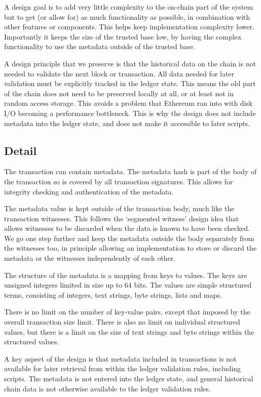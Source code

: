 \documentclass[11pt,a4paper,dvipsnames,twosided]{article}
\begin{document}
A design goal is to add very little complexity to the on-chain part of the
system but to get (or allow for) as much functionality as possible, in
combination with other features or components. This helps keep implementation
complexity lower. Importantly it keeps the size of the trusted base low, by
having the complex functionality to use the metadata outside of the trusted
base.

A design principle that we preserve is that the historical data on the chain is
not needed to validate the next block or transaction. All data needed for later
validation must be explicitly tracked in the ledger state. This means the old
part of the chain does not need to be preserved locally at all, or at least not
in random access storage. This avoids a problem that Ethereum ran into with
disk I/O becoming a performance bottleneck. This is why the design does not
include metadata into the ledger state, and does not make it accessible to
later scripts.

\subsection{Detail}

The transaction can contain metadata. The metadata hash is part of the body of
the transaction so is covered by all transaction signatures. This allows for
integrity checking and authentication of the metadata.

The metadata value is kept outside of the transaction body, much like the
transaction witnesses. This follows the `segmented witness' design idea that
allows witnesses to be discarded when the data is known to have been checked.
We go one step further and keep the metadata outside the body separately from
the witnesses too, in principle allowing an implementation to store or discard
the metadata or the witnesses independently of each other.

The structure of the metadata is a mapping from keys to values. The keys are
unsigned integers limited in size up to 64 bits. The values are simple
structured terms, consisting of integers, text strings, byte strings, lists and
maps.

There is no limit on the number of key-value pairs, except that imposed by the
overall transaction size limit. There is also no limit on individual structured
values, but there is a limit on the size of text strings and byte strings
within the structured values.

A key aspect of the design is that metadata included in transactions is not
available for later retrieval from within the ledger validation rules,
including scripts. The metadata is not entered into the ledger state, and
general historical chain data is not otherwise available to the ledger
validation rules.
\end{document}
